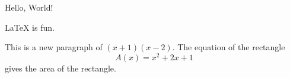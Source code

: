 \documentclass{article}
\begin{document}
Hello, World!

\LaTeX{} is fun.

This is a new paragraph of $(x + 1)(x - 2)$. The equation of the rectangle
\[ A(x) = x^2 + 2x + 1 \]
gives the area of the rectangle.
\end{document}
